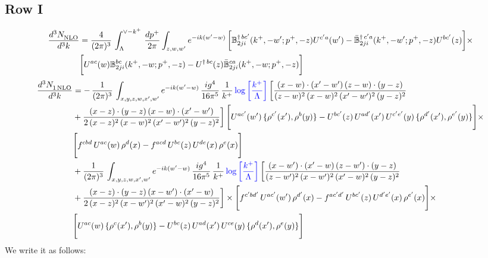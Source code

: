 \documentclass[9pt]{article}
\def\mf#1{\mathbb{#1}}
\numberwithin{equation}{section}
\begin{document}
\subsection{Row I}
\begin{align}
    \frac{d^{3}N_{\rm NLO}^{\rm}}{d^{3}k}  & = \frac{4}{(2\pi)^{3}}\,\int_{\Lambda}^{\vee-k^{+}}\, \frac{dp^{+}}{2\pi}\int_{z,w,w^{\prime}} e^{-ik(w^{\prime}-w)}\, \bigg[\mf{B}^{\dagger\, bc^{\prime}}_{2ji}(k^{+},-w^{\prime};p^{+},-z)U^{ c^{\prime}a}(w^{\prime}) -\Bar{\mf{B}}^{\dagger\, c^{\prime}a}_{2ji}(k^{+},-w^{\prime}; p^{+},-z)U^{bc^{\prime}}(z)\bigg]\times\notag \\ & \bigg[U^{ac}(w) \mf{B}^{bc}_{2ji}(k^{+},-w;p^{+},-z) -U^{\dagger\, bc}(z)\Bar{\mf{B}}^{ca}_{2ji}(k^{+},-w; p^{+},-z)\bigg]\nonumber
\end{align}
\begin{align}
 \frac{d^{3}N_{1\,\rm NLO}^{\rm}}{d^{3}k}  & =   -\, \frac{1}{(2\pi)^{3}}\,\int_{x,y,z,w,x',w^{\prime}} e^{-ik(w^{\prime}-w)}\,\frac{ig^{4}}{16\pi^{5}}\,\frac{1}{k^{+}}\,{\color{blue}\log{\left[\frac{k^{+}}{\Lambda}\right]}}\,\bigg[\frac{(x-w)\cdot (x'-w')\,(z-w)\cdot (y-z)}{(z-w)^{2}\,(x-w)^{2}\,(x'-w')^{2}\,(y-z)^{2}}\notag \\ & +\frac{(x-z)\cdot (y-z)\,(x-w)\cdot (x'-w')}{2\,(x-z)^{2}\, (x-w)^{2}\,(x'-w')^{2}\,(y-z)^{2}}\bigg]\, \Bigg[U^{ac'}(w')\,\{\rho^{c'}(x'),\rho^{b}(y)\}-U^{bc'}(z)\,U^{ad'}(x')\,U^{c'e'}(y)\, \{\rho^{d'}(x'),\rho^{e'}(y)\}\Bigg]\times \notag \\ & \Bigg[f^{cbd}\,U^{ac}(w)\,\rho^{d}(x)-f^{acd}\, U^{bc}(z)\,U^{de}(x)\,\rho^{e}(x)\Bigg]\notag \\ & + \frac{1}{(2\pi)^{3}}\,\int_{x,y,z,w,x',w^{\prime}} e^{-ik(w^{\prime}-w)}\,\frac{ig^{4}}{16\pi^{5}}\,\frac{1}{k^{+}}\,{\color{blue}\log{\left[\frac{k^{+}}{\Lambda}\right]}}\,\bigg[\frac{(x-w')\cdot (x'-w)\,(z-w')\cdot (y-z)}{(z-w')^{2}\,(x-w')^{2}\,(x'-w)^{2}\,(y-z)^{2}}\notag \\ & +\frac{(x-z)\cdot (y-z)\,(x-w')\cdot (x'-w)}{2\,(x-z)^{2}\, (x-w')^{2}\,(x'-w)^{2}\,(y-z)^{2}}\bigg] \times\Bigg[f^{c'bd'}\,U^{ac'}(w')\,\rho^{d'}(x)-f^{ac'd'}\, U^{bc'}(z)\,U^{d'e'}(x)\,\rho^{e'}(x)\Bigg] \times \notag \\ & \Bigg[U^{ac}(w)\,\{\rho^{c}(x'),\rho^{b}(y)\}-U^{bc}(z)\,U^{ad}(x')\,U^{ce}(y)\, \{\rho^{d}(x'),\rho^{e}(y)\}\Bigg]
\end{align}
We write it as follows: 
\end{document}
